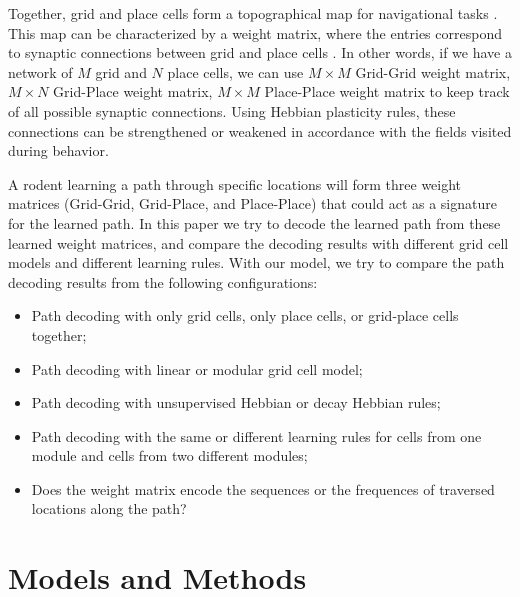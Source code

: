 \documentclass[11pt, letterpaper, onecolumn]{article}
\begin{document}
Together, grid and place cells form a topographical map for navigational tasks \cite{Moser:Place08}. This map can be characterized by a weight matrix, where the entries correspond to synaptic connections between grid and place cells \cite{Burak:Accurate09}. In other words, if we have a network of $ M $ grid and $ N $ place cells, we can use $ M \times M $ Grid-Grid weight matrix,  $ M \times N $ Grid-Place weight matrix, $ M \times M $ Place-Place weight matrix to keep track of all possible synaptic connections. Using Hebbian plasticity rules, these connections can be strengthened or weakened in accordance with the fields visited during behavior. 

A rodent learning a path through specific locations will form three weight matrices (Grid-Grid, Grid-Place, and Place-Place) that could act as a signature for the learned path. In this paper we try to decode the learned path from these learned weight matrices, and compare the decoding results with different grid cell models and different learning rules. With our model, we try to compare the path decoding results from the following configurations:

\begin{itemize}
    \item Path decoding with only grid cells, only place cells, or grid-place cells together;
    \item Path decoding with linear or modular grid cell model;
    \item Path decoding with unsupervised Hebbian or decay Hebbian rules;
    \item Path decoding with the same or different learning rules for cells from one module and cells from two different modules;
    \item Does the weight matrix encode the sequences or the frequences of traversed locations along the path? 
\end{itemize}


\section{Models and Methods}
\end{document}
